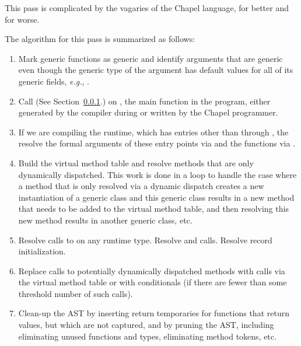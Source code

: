 \documentclass[10pt]{article}
\newcommand{\eg}{\emph{e.g.}}
\begin{document}
This pass is complicated by the vagaries of the Chapel language, for
better and for worse.

The algorithm for this pass is summarized as follows:
\begin{enumerate}
\item Mark generic functions as generic and identify arguments that
  are generic even though the generic type of the argument has default
  values for all of its generic fields, \eg, .
\item Call  (See Section~\ref{sec:resolveFns}.) on
  , the main function in the program, either generated
  by the compiler during  or written by the
  Chapel programmer.
\item If we are compiling the runtime, which has entries other than
  through , the resolve the formal arguments of these entry
  points via  and the functions via
  .
\item Build the virtual method table and resolve methods that are only
  dynamically dispatched.  This work is done in a loop to handle the
  case where a method that is only resolved via a dynamic dispatch
  creates a new instantiation of a generic class and this generic
  class results in a new method that needs to be added to the virtual
  method table, and then resolving this new method results in another
  generic class, etc.
\item Resolve calls to  on any
  runtime type.  Resolve  and  calls.
  Resolve record initialization.
\item Replace calls to potentially dynamically dispatched methods with
  calls via the virtual method table or with conditionals (if there
  are fewer than some threshold number of such calls).
\item Clean-up the AST by inserting return temporaries for functions
  that return values, but which are not captured, and by pruning the
  AST, including eliminating unused functions and types, eliminating
  method tokens, etc.
\end{enumerate}

\subsubsection{}
\label{sec:resolveFns}
\end{document}
